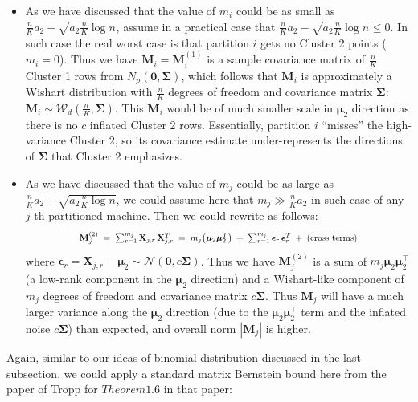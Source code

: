 \documentclass[11pt]{article}
\numberwithin{equation}{section}
\theoremstyle{plain}
\theoremstyle{definition}
\theoremstyle{remark}
\begin{document}
\begin{itemize}
  \item
    As we have discussed that the value of $m_{i}$ could be as small as $\frac{n}{K}a_2 - \sqrt{a_2 \frac{n}{K}{\log n}}$, assume in a practical case that $\frac{n}{K}a_2 - \sqrt{a_2 \frac{n}{K}{\log n}} \leq 0$. In such case the real worst case is that
    partition $i$ gets no Cluster 2 points ($m_i=0$). Thus we have
    $\mathbf{M}_{i} = \mathbf{M}_{i}^{(1)}$ is a sample covariance matrix of $\frac{n}{K}$ Cluster 1 rows from $N_{p}(\boldsymbol 0,\mathbf{\Sigma})$, which follows that $\mathbf{M}_{i}$
    is approximately a Wishart distribution with $\frac{n}{K}$ degrees of freedom and covariance matrix $\mathbf{\Sigma}$:
    $\mathbf{M}_{i} \sim \mathcal{W}_d(\frac{n}{K},\mathbf{\Sigma})$.
    This $\mathbf{M}_{i}$ would be of much smaller scale in $\boldsymbol\mu_2$ direction as there is no $c$ inflated Cluster 2 rows.
    Essentially, partition $i$ “misses” the high-variance Cluster 2, so its covariance estimate under-represents the directions of $\mathbf{\Sigma}$ that Cluster 2 emphasizes.
  \item
    As we have discussed that the value of $m_{j}$ could be as large as $\frac{n}{K}a_2 + \sqrt{a_2 \frac{n}{K}{\log n}}$, we could assume here that $m_{j} \gg \frac{n}{K}a_2$ in such case of any $j$-th partitioned machine.
    Then we could rewrite as follows:
    \[
    \scalebox{0.79}{$
      \mathbf{M}^{(2)}_{j}
      \;=\;
      \sum_{r=1}^{m_j} \mathbf{X}_{j,r}\,\mathbf{X}_{j,r}^{T}
      \;=\;
      m_j \bigl(\boldsymbol\mu_2 \boldsymbol\mu_2^{T}\bigr)
      \;+\;
      \sum_{r=1}^{m_j} \boldsymbol\epsilon_{r}\,\boldsymbol\epsilon_{r}^{T}
      \;+\;
      \text{(cross terms)}
      $}
    \]
    where $\boldsymbol\epsilon_{r} = \mathbf{X}_{j,r} - \boldsymbol\mu_2 \sim \mathcal{N}(\boldsymbol 0,c\mathbf{\Sigma})$.
    Thus we have $\mathbf{M}^{(2)}_{j}$ is a sum of $m_j\boldsymbol\mu_2\boldsymbol\mu_2^{\top}$ (a low-rank component in the $\boldsymbol\mu_2$ direction) and a Wishart-like component of $m_j$ degrees of freedom and covariance matrix $c\mathbf{\Sigma}$.
    Thus $\mathbf{M}_{j}$ will have a much larger variance along the $\boldsymbol\mu_2$ direction (due to the $\boldsymbol\mu_2\boldsymbol\mu_2^{\top}$ term and the inflated noise $c\mathbf{\Sigma}$) than expected, and overall norm $|\mathbf{M}_{j}|$ is higher.
\end{itemize}
Again, similar to our ideas of binomial distribution discussed in the last subsection, we could apply a standard matrix Bernstein bound here from the paper of Tropp \cite{Tropp_2011} for $Theorem 1.6$ in that paper:
\end{document}
